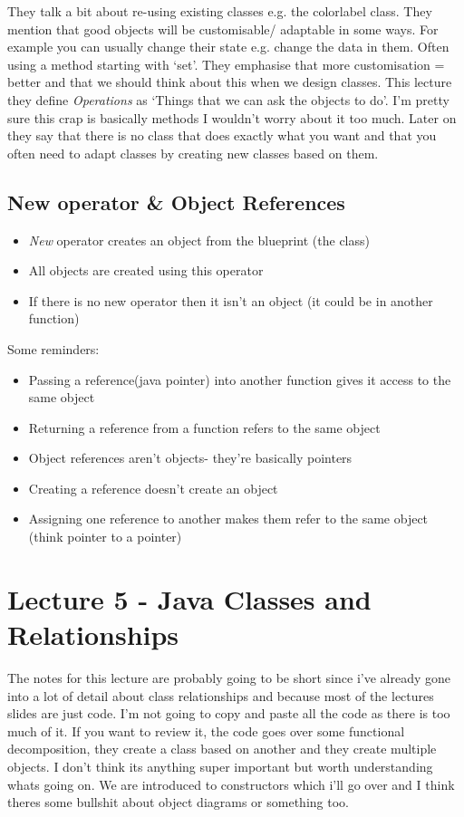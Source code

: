 \documentclass{article}
\begin{document}
They talk a bit about re-using existing classes e.g. the colorlabel class. They mention that
good objects will be customisable/ adaptable in some ways. For example you can usually change their
state e.g. change the data in them. Often using a method starting with `set'. They emphasise that
more customisation = better and that we should think about this when we design
classes. This lecture they define \emph{Operations} as `Things that we can ask the objects to do'.
I'm pretty sure this crap is basically methods I wouldn't worry about it too much. Later on they
say that there is no class that does exactly what you want and that you often need to adapt classes
by creating new classes based on them.

\subsection{New operator \& Object References}

\begin{itemize}
\item \emph{New} operator creates an object from the blueprint (the class)
\item All objects are created using this operator
\item If there is no new operator then it isn't an object (it could be in another function)
\end{itemize}
Some reminders:

\begin{itemize}
\item Passing a reference(java pointer) into another function gives it access to the same object
\item Returning a reference from a function refers to the same object
\item Object references aren't objects- they're basically pointers 
\item Creating a reference doesn't create an object
\item Assigning one reference to another makes them refer to the same object (think pointer to a pointer)
\end{itemize}

\section{Lecture 5 - Java Classes and Relationships}
The notes for this lecture are probably going to be short since i've already gone into a lot of detail about 
class relationships and because most of the lectures slides are just code. I'm not going to copy and paste 
all the code as there is too much of it. If you want to review it, the code goes over some functional 
decomposition, they create a class based on another and they create multiple objects. I don't think
its anything super important but worth understanding whats going on. We are introduced to constructors
which i'll go over and I think theres some bullshit about object diagrams or something too.
\end{document}
